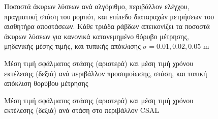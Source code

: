 \begin{figure}
  \hspace{-1.5cm}
  
  \vspace{-1cm}
\caption{\small Ποσοστά άκυρων λύσεων ανά αλγόριθμο, περιβάλλον ελέγχου,
         πραγματική στάση του ρομπότ, και επίπεδο διαταραχών μετρήσεων του
         αισθητήρα αποστάσεων. Κάθε τριάδα ράβδων απεικονίζει τα ποσοστά
         άκυρων λύσεων για κανονικά κατανεμημένο θόρυβο μέτρησης, μηδενικής
         μέσης τιμής, και τυπικής απόκλισης $\sigma = 0.01, 0.02, 0.05$ m}
\label{fig:02_03_04:outliers}
\end{figure}

\begin{figure}
  \hspace{-0.5cm}
  \begin{subfigure}{0.5\linewidth}
    
  \end{subfigure}\hspace{1.0cm}
  \begin{subfigure}{0.5\linewidth}
    
  \end{subfigure}
  \vspace{-2.5cm}
  \caption{\small Μέση τιμή σφάλματος στάσης (αριστερά) και μέση τιμή χρόνου
           εκτέλεσης (δεξιά) ανά περιβάλλον προσομοίωσης, στάση, και τυπική
           απόκλιση θορύβου μέτρησης}
\label{fig:02_03_04:sim_pose_errors_and_exec_times}
\end{figure}

\begin{figure}[]
  \hspace{1cm}
  \begin{subfigure}{0.5\linewidth}
    
  \end{subfigure}%
  \begin{subfigure}{0.5\linewidth}
    
  \end{subfigure}
  \vspace{1cm}
\caption{\small Μέση τιμή σφάλματος στάσης (αριστερά) και μέση τιμή χρόνου
           εκτέλεσης (δεξιά) ανά στάση στο περιβάλλον CSAL}
\label{fig:02_03_04:csal_pose_errors_and_exec_times}
\end{figure}

